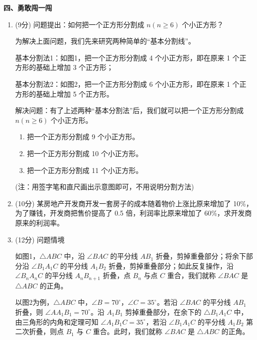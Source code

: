 \documentclass[11pt,a4paper]{ctexart}
\begin{document}
\vspace{0.8cm}

\noindent \textbf{四、勇敢闯一闯}

\begin{enumerate}
    \item[15.] (9分) 问题提出：如何把一个正方形分割成 $n (n \ge 6)$ 个小正方形？
    
    为解决上面问题，我们先来研究两种简单的“基本分割线”。
    
    基本分割法1：如图1，把一个正方形分割成 4 个小正方形，即在原来 1 个正方形的基础上增加 3 个正方形；
    
    基本分割法2：如图2，把一个正方形分割成 6 个小正方形，即在原来 1 个正方形的基础上增加 5 个正方形。
    
    解决问题：有了上述两种“基本分割法”后，我们就可以把一个正方形分割成 $n (n \ge 6)$ 个小正方形。
    \begin{enumerate}
        \item[(1)] 把一个正方形分割成 9 个小正方形。
        \vspace{4.0cm}
        
        \item[(2)] 把一个正方形分割成 10 个小正方形。
        \vspace{4.0cm}
        
        \item[(3)] 把一个正方形分割成 11 个小正方形。
        \vspace{4.0cm}
    \end{enumerate}
    (注：用签字笔和直尺画出示意图即可，不用说明分割方法)
    
    \item[16.] (10分) 某房地产开发商开发一套房子的成本随着物价上涨比原来增加了 10\%，为了赚钱，开发商把售价提高了 0.5 倍，利润率比原来增加了 60\%，求开发商原来的利润率。
    \vspace{4.5cm}

    \item[17.] (12分) 问题情境
    
    如图1，$\triangle ABC$ 中，沿 $\angle BAC$ 的平分线 $AB_1$ 折叠，剪掉重叠部分；将余下部分沿 $\angle B_1A_1C$ 的平分线 $A_1B_2$ 折叠，剪掉重叠部分；如此反复操作，沿 $\angle B_nA_nC$ 的平分线 $A_nB_{n+1}$ 折叠，点 $B_n$ 与点 $C$ 重合，我们就称 $\angle BAC$ 是 $\triangle ABC$ 的正角。
    
    以图2为例，$\triangle ABC$ 中，$\angle B=70^\circ$，$\angle C=35^\circ$。若沿 $\angle BAC$ 的平分线 $AB_1$ 折叠，则 $\angle AA_1B_1=70^\circ$。沿 $A_1B_1$ 剪掉重叠部分，在余下的 $\triangle B_1A_1C$ 中，由三角形的内角和定理可知 $\angle A_1B_1C=35^\circ$，若沿 $\angle B_1A_1C$ 的平分线 $A_1B_2$ 第二次折叠，则点 $B_1$ 与 $C$ 重合。此时，我们就称 $\angle BAC$ 是 $\triangle ABC$ 的正角。
    

\end{enumerate}
\end{document}
